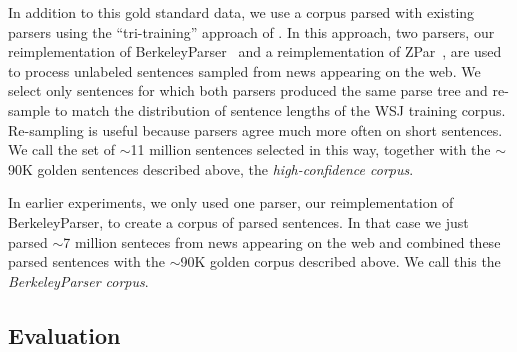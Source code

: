 \documentclass{article} \usepackage{nips15submit_e,times}
\begin{document}
In addition to this gold standard data, we use a corpus parsed with existing
parsers using the ``tri-training'' approach of \cite{Li0C14}. In this approach,
two parsers, our reimplementation of BerkeleyParser~\cite{petrov-EtAl:2006:ACL}
and a reimplementation of ZPar~\cite{zhu-EtAl:2013:ACL}, are used to process
unlabeled sentences sampled from news appearing on the web. We select only
sentences for which both parsers produced the same parse tree and re-sample
to match the distribution of sentence lengths of the WSJ training corpus.
Re-sampling is useful because parsers agree much more often on short sentences.
We call the set of $\sim$11 million sentences selected in this way,
together with the $\sim$90K golden sentences described above,
the \emph{high-confidence corpus}.

In earlier experiments, we only used one parser, our reimplementation of BerkeleyParser,
to create a corpus of parsed sentences. In that case we just parsed $\sim$7 million
senteces from news appearing on the web and combined these parsed sentences with the
$\sim$90K golden corpus described above. We call this the \emph{BerkeleyParser corpus}.

\subsection{Evaluation}
\end{document}
